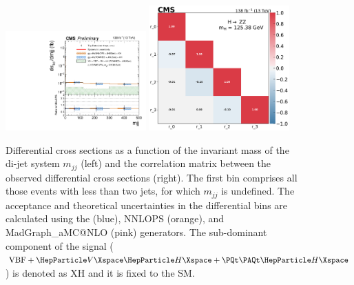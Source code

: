 \begin{center}
	\begin{figure}[!htb]
		\centering
		\includegraphics[width=0.48\textwidth]{Images/H4L/mjj_unfoldwith_SM_125_logscale_asimov.pdf}	\includegraphics[width=0.48\textwidth]{Images/H4L/correlations/corr_mjj_v3.pdf}\\
		\caption{
			Differential cross sections as a function of the invariant mass of the di-jet system $m_{jj}$ (left) and the correlation matrix between the observed differential cross sections (right).
			The first bin comprises all those events with less than two jets, for which $m_{jj}$  is undefined.
			The acceptance and theoretical uncertainties in the differential bins are calculated using the \POWHEG (blue), NNLOPS (orange), and MadGraph\_aMC@NLO (pink) generators.
			The sub-dominant component of the signal ($\VBF + \VH + \ttH$) is denoted as XH and it is fixed to the SM.
			\label{fig:fidMJJ}}
	\end{figure}
\end{center}

\clearpage



